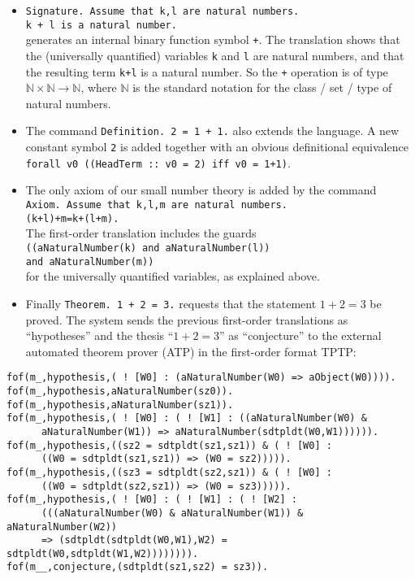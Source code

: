 \documentclass[11pt]{article}
\begin{document}
\begin{itemize}
\item \verb/Signature. Assume that k,l are natural numbers./\\
\verb/k + l is a natural number./\\ 
generates an
internal binary function symbol \verb/+/. The translation
shows that the (universally quantified) variables \verb/k/ and
\verb/l/ are natural numbers, and that the resulting term
\verb/k+l/ is a natural number. So the \verb/+/ operation is
of type $\mathbb{N} \times \mathbb{N} \rightarrow \mathbb{N}$, where
$\mathbb{N}$ is the standard notation for the class / set / type of
natural numbers.

\item The command \verb/Definition. 2 = 1 + 1./ also extends the
language. A new constant symbol \verb/2/ is added together with
an obvious definitional equivalence
\verb/forall v0 ((HeadTerm :: v0 = 2) iff v0 = 1+1)/.

\item The only axiom of our small number theory is added by the
command \\
\verb/Axiom. Assume that k,l,m are natural numbers./\\
\verb/(k+l)+m=k+(l+m)./\\
The first-order translation
includes the guards\\
\verb/((aNaturalNumber(k) and aNaturalNumber(l))/\\
\verb/and aNaturalNumber(m))/\\
for the universally quantified variables, as explained above.

\item Finally
\verb/Theorem. 1 + 2 = 3./ requests that the statement $1+2=3$ be
proved. The system sends the previous first-order
translations as ``hypotheses'' and the thesis ``$1+2=3$'' as
``conjecture'' to the external automated theorem prover (ATP) in
the first-order format TPTP:
\end{itemize}
\begin{footnotesize}
\begin{verbatim}
fof(m_,hypothesis,( ! [W0] : (aNaturalNumber(W0) => aObject(W0)))).
fof(m_,hypothesis,aNaturalNumber(sz0)).
fof(m_,hypothesis,aNaturalNumber(sz1)).
fof(m_,hypothesis,( ! [W0] : ( ! [W1] : ((aNaturalNumber(W0) & 
      aNaturalNumber(W1)) => aNaturalNumber(sdtpldt(W0,W1)))))).
fof(m_,hypothesis,((sz2 = sdtpldt(sz1,sz1)) & ( ! [W0] :
      ((W0 = sdtpldt(sz1,sz1)) => (W0 = sz2))))).
fof(m_,hypothesis,((sz3 = sdtpldt(sz2,sz1)) & ( ! [W0] : 
      ((W0 = sdtpldt(sz2,sz1)) => (W0 = sz3))))).
fof(m_,hypothesis,( ! [W0] : ( ! [W1] : ( ! [W2] :
      (((aNaturalNumber(W0) & aNaturalNumber(W1)) & aNaturalNumber(W2))
      => (sdtpldt(sdtpldt(W0,W1),W2) = sdtpldt(W0,sdtpldt(W1,W2)))))))).
fof(m__,conjecture,(sdtpldt(sz1,sz2) = sz3)).
\end{verbatim}
\end{footnotesize}
\end{document}
